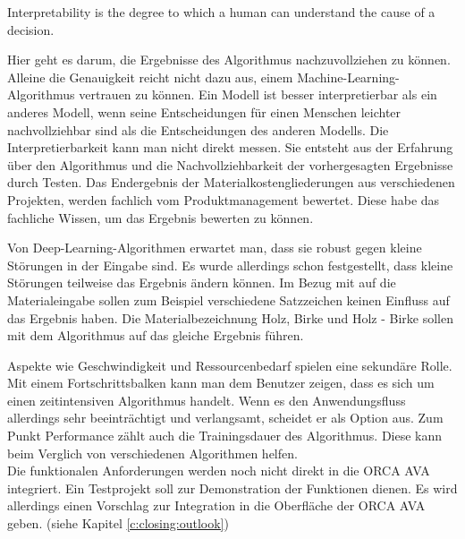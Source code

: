 \begin{definition}[Interpretierbarkeit]
	\label{d:interpretability}
	\glqq Interpretability is the degree to which a human can understand the cause of a decision.\grqq{}\citep{miller_2017}
\end{definition}
Hier geht es darum, die Ergebnisse des Algorithmus nachzuvollziehen zu können. Alleine die Genauigkeit reicht nicht dazu aus, einem Machine-Learning-Algorithmus vertrauen zu können.
Ein Modell ist besser interpretierbar als ein anderes Modell, wenn seine Entscheidungen für einen Menschen leichter nachvollziehbar sind als die Entscheidungen des anderen Modells. Die Interpretierbarkeit kann man nicht direkt messen. Sie entsteht aus der Erfahrung über den Algorithmus und die Nachvollziehbarkeit der vorhergesagten Ergebnisse durch Testen.  \citep{molnar2022} Das Endergebnis der Materialkostengliederungen aus verschiedenen Projekten, werden fachlich vom Produktmanagement bewertet. Diese habe das fachliche Wissen, um das Ergebnis bewerten zu können.


Von Deep-Learning-Algorithmen erwartet man, dass sie robust gegen kleine Störungen in der Eingabe sind. Es wurde allerdings schon festgestellt, dass kleine Störungen teilweise das Ergebnis ändern können. \citep{Szegedy_2013} Im Bezug mit auf die Materialeingabe sollen zum Beispiel verschiedene Satzzeichen keinen Einfluss auf das Ergebnis haben. Die Materialbezeichnung \glqq Holz, Birke\grqq{} und \glqq Holz - Birke\grqq{} sollen mit dem Algorithmus auf das gleiche Ergebnis führen.


Aspekte wie Geschwindigkeit und Ressourcenbedarf spielen eine sekundäre Rolle. Mit einem Fortschrittsbalken kann man dem Benutzer zeigen, dass es sich um einen zeitintensiven Algorithmus handelt. Wenn es den Anwendungsfluss allerdings sehr beeinträchtigt und verlangsamt, scheidet er als Option aus. Zum Punkt Performance zählt auch die Trainingsdauer des Algorithmus. Diese kann beim Verglich von verschiedenen Algorithmen helfen.\\

Die funktionalen Anforderungen werden noch nicht direkt in die ORCA AVA integriert. Ein Testprojekt soll zur Demonstration der Funktionen dienen. Es wird allerdings einen Vorschlag zur Integration in die Oberfläche der ORCA AVA geben. (siehe Kapitel \ref{c:closing:outlook})



